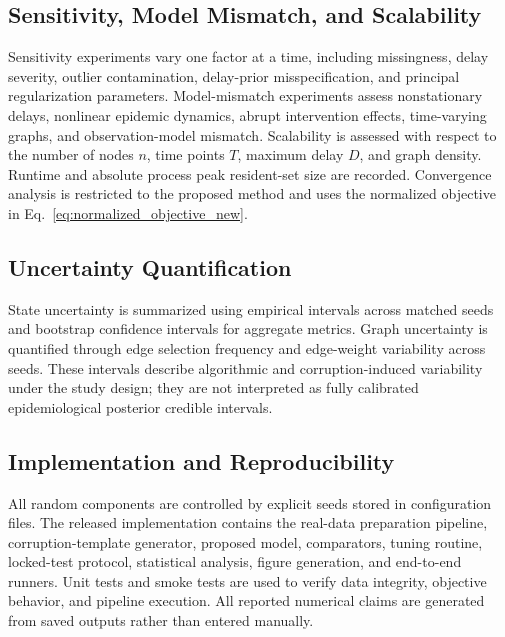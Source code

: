 \subsection{Sensitivity, Model Mismatch, and Scalability}
\label{subsec:additional_experiments_new}
Sensitivity experiments vary one factor at a time, including missingness, delay severity, outlier contamination, delay-prior misspecification, and principal regularization parameters. Model-mismatch experiments assess nonstationary delays, nonlinear epidemic dynamics, abrupt intervention effects, time-varying graphs, and observation-model mismatch. Scalability is assessed with respect to the number of nodes $n$, time points $T$, maximum delay $D$, and graph density. Runtime and absolute process peak resident-set size are recorded. Convergence analysis is restricted to the proposed method and uses the normalized objective in Eq.~\eqref{eq:normalized_objective_new}.

\subsection{Uncertainty Quantification}
\label{subsec:uncertainty_quantification_new}
State uncertainty is summarized using empirical intervals across matched seeds and bootstrap confidence intervals for aggregate metrics. Graph uncertainty is quantified through edge selection frequency and edge-weight variability across seeds. These intervals describe algorithmic and corruption-induced variability under the study design; they are not interpreted as fully calibrated epidemiological posterior credible intervals.

\subsection{Implementation and Reproducibility}
\label{subsec:implementation_reproducibility_new}
All random components are controlled by explicit seeds stored in configuration files. The released implementation contains the real-data preparation pipeline, corruption-template generator, proposed model, comparators, tuning routine, locked-test protocol, statistical analysis, figure generation, and end-to-end runners. Unit tests and smoke tests are used to verify data integrity, objective behavior, and pipeline execution. All reported numerical claims are generated from saved outputs rather than entered manually.
